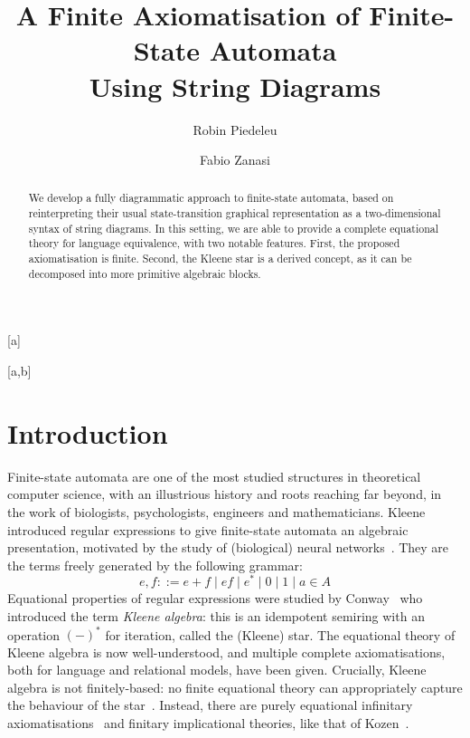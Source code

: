 \documentclass{lmcs}
\theoremstyle{plain}\newtheorem{satz}[thm]{Satz} %
\begin{document}
\title[A Finite Axiomatisation of Finite-State Automata Using String Diagrams]{A Finite Axiomatisation of Finite-State Automata \texorpdfstring{\\}{} Using String Diagrams}

\author[R.~Piedeleu]{Robin Piedeleu}[a]%
\address{University College London, United Kingdom}	%

\author[F.~Zanasi]{Fabio Zanasi}[a,b]	%
\address{University of Bologna, Italy}	%


\begin{abstract}
	\noindent We develop a fully diagrammatic approach to finite-state automata, based on reinterpreting their usual state-transition graphical representation as a two-dimensional syntax of string diagrams. In this setting, we are able to provide a complete equational theory for language equivalence, with two notable features. First, the proposed axiomatisation is finite. Second, the Kleene star is a derived concept, as it can be decomposed into more primitive algebraic blocks.
\end{abstract}

\maketitle

\section{Introduction}\label{S:one}

Finite-state automata are one of the most studied structures in theoretical computer science, with an illustrious history and roots reaching far beyond, in the work of biologists, psychologists, engineers and mathematicians. Kleene~\cite{kleene1951representation} introduced regular expressions to give finite-state automata an algebraic presentation, motivated by the study of (biological) neural networks~\cite{mcculloch1943logical}. They are the terms freely generated by the following grammar:
\begin{equation*}
e, f ::= e + f \mid ef \mid e^* \mid 0 \mid 1 \mid a\in A
\end{equation*}
Equational properties of regular expressions were studied by Conway~\cite{conway2012regular} who introduced the term \emph{Kleene algebra}: this is an idempotent semiring with an operation $(-)^*$ for iteration, called the (Kleene) star. The equational theory of Kleene algebra is now well-understood, and multiple complete axiomatisations, both for language and relational models, have been given. Crucially, Kleene algebra is not finitely-based: no finite equational theory can appropriately capture the behaviour of the star~\cite{redko1964defining}. Instead, there are purely  equational infinitary axiomatisations~\cite{krob1991complete,bloom1993equational} and finitary implicational theories, like that of Kozen~\cite{kozen1994completeness}.
\end{document}
